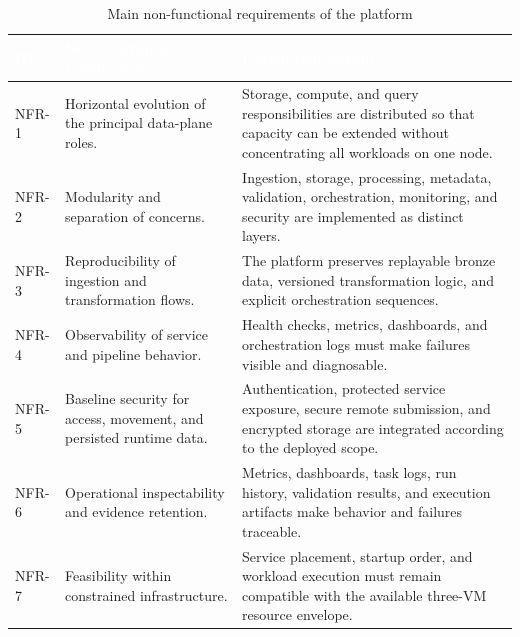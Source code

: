 \begin{table}[!htbp]
    \centering
    \footnotesize
    \renewcommand{\arraystretch}{1.16}
    \begin{tabularx}{\textwidth}{|L{1.4cm}|Y|Y|}
        \hline
        \textcolor{white}{\textbf{ID}} & \textcolor{white}{\textbf{Non-functional requirement}} & \textcolor{white}{\textbf{Design implication}} \\
        \hline
        NFR-1 & Horizontal evolution of the principal data-plane roles. & Storage, compute, and query responsibilities are distributed so that capacity can be extended without concentrating all workloads on one node. \\
        \hline
        NFR-2 & Modularity and separation of concerns. & Ingestion, storage, processing, metadata, validation, orchestration, monitoring, and security are implemented as distinct layers. \\
        \hline
        NFR-3 & Reproducibility of ingestion and transformation flows. & The platform preserves replayable bronze data, versioned transformation logic, and explicit orchestration sequences. \\
        \hline
        NFR-4 & Observability of service and pipeline behavior. & Health checks, metrics, dashboards, and orchestration logs must make failures visible and diagnosable. \\
        \hline
        NFR-5 & Baseline security for access, movement, and persisted runtime data. & Authentication, protected service exposure, secure remote submission, and encrypted storage are integrated according to the deployed scope. \\
        \hline
        NFR-6 & Operational inspectability and evidence retention. & Metrics, dashboards, task logs, run history, validation results, and execution artifacts make behavior and failures traceable. \\
        \hline
        NFR-7 & Feasibility within constrained infrastructure. & Service placement, startup order, and workload execution must remain compatible with the available three-VM resource envelope. \\
        \hline
    \end{tabularx}
    \caption{Main non-functional requirements of the platform}
    \label{tab:chapter4-nonfunctional}
\end{table}
\FloatBarrier

